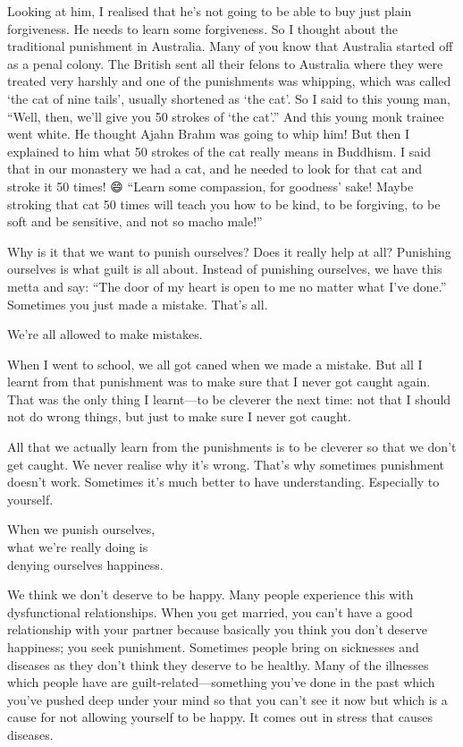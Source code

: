 \documentclass[12pt, openany]{book}
\newenvironment{aphorism}%
{%
\begin{center}\begin{itshape}
}%
{\end{itshape}\end{center}
}%
\begin{document}
Looking at him, I realised that he’s not going to be able to buy just plain forgiveness. He needs to learn some forgiveness. So I thought about the traditional punishment in Australia. Many of you know that Australia started off as a penal colony. The British sent all their felons to Australia where they were treated very harshly and one of the punishments was whipping, which was called ‘the cat of nine tails’, usually shortened as ‘the cat’. So I said to this young man, “Well, then, we’ll give you 50 strokes of ‘the cat’.” And this young monk trainee went white. He thought Ajahn Brahm was going to whip him! But then I explained to him what 50 strokes of the cat really means in Buddhism. I said that in our monastery we had a cat, and he needed to look for that cat and stroke it 50 times! 😄 “Learn some compassion, for goodness’ sake! Maybe stroking that cat 50 times will teach you how to be kind, to be forgiving, to be soft and be sensitive, and not so macho male!” 

Why is it that we want to punish ourselves? Does it really help at all? Punishing ourselves is what guilt is all about. Instead of punishing ourselves, we have this metta and say: “The door of my heart is open to me no matter what I’ve done.” Sometimes you just made a mistake. That’s all. 

\begin{aphorism}
We’re all allowed to make mistakes.
\end{aphorism}
When I went to school, we all got caned when we made a mistake. But all I learnt from that punishment was to make sure that I never got caught again. That was the only thing I learnt—to be cleverer the next time: not that I should not do wrong things, but just to make sure I never got caught. 

All that we actually learn from the punishments is to be cleverer so that we don’t get caught. We never realise why it’s wrong. That’s why sometimes punishment doesn’t work. Sometimes it’s much better to have understanding. Especially to yourself. 

\begin{aphorism}
When we punish ourselves,\\  
what we’re really doing is\\ 
denying ourselves happiness.
\end{aphorism}

We think we don’t deserve to be happy. Many people experience this with dysfunctional relationships. When you get married, you can’t have a good relationship with your partner because basically you think you don’t deserve happiness; you seek punishment. Sometimes people bring on sicknesses and diseases as they don’t think they deserve to be healthy. Many of the illnesses which people have are guilt-related—something you’ve done in the past which you’ve pushed deep under your mind so that you can’t see it now but which is a cause for not allowing yourself to be happy. It comes out in stress that causes diseases. 
\end{document}
